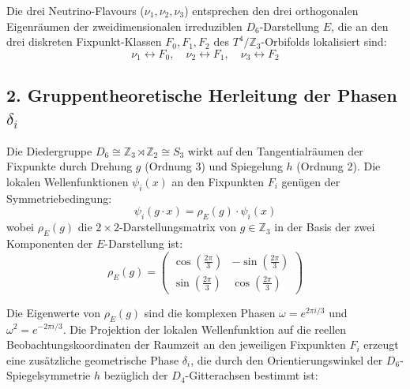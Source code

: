 \documentclass[11pt,a4paper]{article}
\begin{document}
	Die drei Neutrino-Flavours ($\nu_1, \nu_2, \nu_3$) entsprechen den drei orthogonalen Eigenräumen der zweidimensionalen irreduziblen $D_6$-Darstellung $E$, die an den drei diskreten Fixpunkt-Klassen $F_0, F_1, F_2$ des $T^4/\mathbb{Z}_3$-Orbifolds lokalisiert sind:
	\begin{equation}
		\nu_1 \longleftrightarrow F_0, \quad \nu_2 \longleftrightarrow F_1, \quad \nu_3 \longleftrightarrow F_2
	\end{equation}
	
	\subsection{2. Gruppentheoretische Herleitung der Phasen \texorpdfstring{$\delta_i$}{delta\_i}}
	Die Diedergruppe $D_6 \cong \mathbb{Z}_3 \rtimes \mathbb{Z}_2 \cong S_3$ wirkt auf den Tangentialräumen der Fixpunkte durch Drehung $g$ (Ordnung 3) und Spiegelung $h$ (Ordnung 2). Die lokalen Wellenfunktionen $\psi_i(x)$ an den Fixpunkten $F_i$ genügen der Symmetriebedingung:
	\begin{equation}
		\psi_i(g \cdot x) = \rho_E(g) \cdot \psi_i(x)
	\end{equation}
	wobei $\rho_E(g)$ die $2 \times 2$-Darstellungsmatrix von $g \in \mathbb{Z}_3$ in der Basis der zwei Komponenten der $E$-Darstellung ist:
	\begin{equation}
		\rho_E(g) = \begin{pmatrix} \cos\left(\frac{2\pi}{3}\right) & -\sin\left(\frac{2\pi}{3}\right) \\ \sin\left(\frac{2\pi}{3}\right) & \cos\left(\frac{2\pi}{3}\right) \end{pmatrix}
	\end{equation}
	
	Die Eigenwerte von $\rho_E(g)$ sind die komplexen Phasen $\omega = e^{2\pi i / 3}$ und $\omega^2 = e^{-2\pi i / 3}$. Die Projektion der lokalen Wellenfunktion auf die reellen Beobachtungskoordinaten der Raumzeit an den jeweiligen Fixpunkten $F_i$ erzeugt eine zusätzliche geometrische Phase $\delta_i$, die durch den Orientierungswinkel der $D_6$-Spiegelsymmetrie $h$ bezüglich der $D_4$-Gitterachsen bestimmt ist:
	
\end{document}
